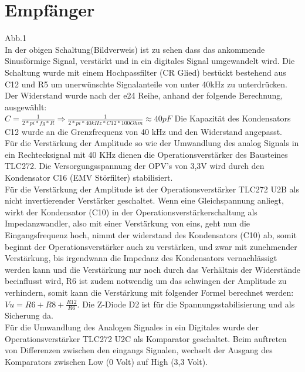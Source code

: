\section{Empfänger}
Abb.1\\
In der obigen Schaltung(Bildverweis) ist zu sehen dass das ankommende Sinusförmige Signal, verstärkt und in ein digitales Signal umgewandelt wird. Die Schaltung wurde mit einem Hochpassfilter (CR Glied) bestückt bestehend aus C12 und R5 um unerwünschte Signalanteile von unter 40kHz zu unterdrücken. Der Widerstand wurde nach der e24 Reihe, anhand der folgende Berechnung, ausgewählt:
\onehalfspacing \\
\(\displaystyle C=\frac{1}{2*pi*fg*R}\Rightarrow\frac{1}{2*pi*40kHz*C12*100 Ohm}\approx40pF \)
\singlespacing
Die Kapazität des Kondensators C12 wurde an die Grenzfrequenz von 40 kHz und den Widerstand angepasst.\\
Für die Verstärkung der Amplitude so wie der Umwandlung des analog Signals in ein Rechtecksignal mit 40 KHz  dienen die Operationsverstärker des Bausteines TLC272. Die Versorgungsspannung der OPV's von 3,3V wird durch den Kondensator C16 (EMV Störfilter) stabilisiert.\\
Für die Verstärkung der Amplitude ist der Operationsverstärker TLC272 U2B als  nicht invertierender Verstärker geschaltet.
Wenn eine Gleichspannung anliegt, wirkt der Kondensator (C10) in der Operationsverstärkerschaltung als Impedanzwandler, also mit einer Verstärkung von eins, geht nun die Eingangsfrequenz hoch, nimmt der widerstand des Kondensators (C10) ab, somit beginnt der Operationsverstärker auch zu verstärken, und zwar mit zunehmender Verstärkung, bis irgendwann die Impedanz des Kondensators vernachlässigt werden kann und die Verstärkung nur noch durch das Verhältnis der Widerstände beeinflusst wird, R6 ist zudem notwendig um das schwingen der Amplitude zu verhindern, somit kann die Verstärkung mit folgender Formel berechnet werden:
\onehalfspacing \\
\(\displaystyle Vu=R6+R8+\frac{R12}{R6} .\) 
\singlespacing
Die Z-Diode D2 ist für die Spannungsstabilisierung und als Sicherung da.\\
Für die Umwandlung des Analogen Signales in ein Digitales wurde der Operationsverstärker TLC272 U2C als Komparator geschaltet. Beim auftreten von Differenzen zwischen den eingangs Signalen, wechselt der Ausgang des Komparators zwischen Low (0 Volt) auf High (3,3 Volt).

